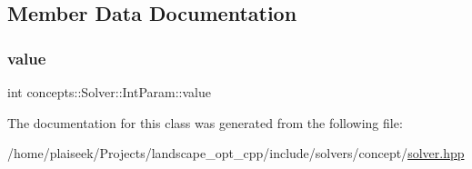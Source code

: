 \subsection{Member Data Documentation}
\mbox{\label{classconcepts_1_1_solver_1_1_int_param_a54714a8509c12174fdd81a92d3ed63d5}} 
\subsubsection{\texorpdfstring{value}{value}}
{\footnotesize\ttfamily int concepts\+::\+Solver\+::\+Int\+Param\+::value\hspace{0.3cm}{\ttfamily [protected]}}



The documentation for this class was generated from the following file\+:\begin{DoxyCompactItemize}
\item 
/home/plaiseek/\+Projects/landscape\+\_\+opt\+\_\+cpp/include/solvers/concept/\hyperlink{solver_8hpp}{solver.\+hpp}\end{DoxyCompactItemize}
